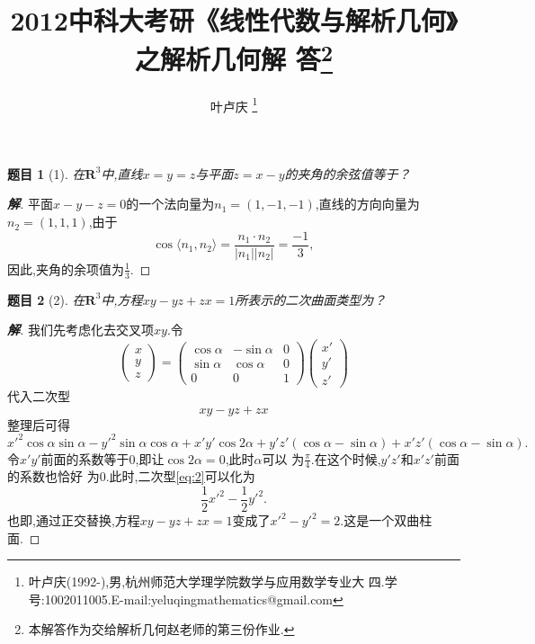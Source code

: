 ﻿\documentclass[a4paper]{article}
\newtheorem*{exe}{题目}
\newenvironment{exercise}
{\bigskip\begin{mdframed}\begin{exe}}
    {\end{exe}\end{mdframed}\bigskip}
\numberwithin{equation}{section}
\begin{document}
\title{{\bf{2012中科大考研《线性代数与解析几何》之解析几何解
      答\footnote{本解答作为交给解析几何赵老师的第三份作业.}}}} \author{\small{叶卢庆
    \footnote{叶卢庆(1992-),男,杭州师范大学理学院数学与应用数学专业大
      四.学号:1002011005.E-mail:yeluqingmathematics@gmail.com}}}
\maketitle
\begin{exercise}[1]
  在$\mathbf{R}^3$中,直线$x=y=z$与平面$z=x-y$的夹角的余弦值等于？
\end{exercise}
\begin{proof}[\textbf{解}]
平面$x-y-z=0$的一个法向量为$n_{1}=(1,-1,-1)$,直线的方向向量为
$n_{2}=(1,1,1)$,由于
$$
\cos \langle n_1,n_2\rangle=\frac{n_1\cdot n_2}{|n_1||n_2|}=\frac{-1}{3},
$$
因此,夹角的余项值为$\frac{1}{3}$.
\end{proof}
\begin{exercise}[2]
  在$\mathbf{R}^3$中,方程$xy-yz+zx=1$所表示的二次曲面类型为？
\end{exercise}
\begin{proof}[\textbf{解}]
  我们先考虑化去交叉项$xy$.令
$$
\begin{pmatrix}
  x\\
  y\\
  z
\end{pmatrix}=
\begin{pmatrix}
  \cos\alpha&-\sin\alpha&0\\
  \sin\alpha&\cos\alpha&0\\
  0&0&1
\end{pmatrix}
\begin{pmatrix}
  x'\\
  y'\\
  z'
\end{pmatrix}
$$
代入二次型
\begin{equation}
  \label{eq:1}
  xy-yz+zx
\end{equation}
整理后可得
\begin{equation}
  \label{eq:2}
  x'^{2}\cos\alpha\sin\alpha-y'^{2}\sin\alpha\cos\alpha+x'y'\cos
  2\alpha+y'z'(\cos\alpha-\sin\alpha)+x'z'(\cos\alpha-\sin\alpha).
\end{equation}
令$x'y'$前面的系数等于$0$,即让$\cos 2\alpha=0$,此时$\alpha$可以
为$\frac{\pi}{4}$.在这个时候,$y'z'$和$x'z'$前面的系数也恰好
为$0$.此时,二次型\eqref{eq:2}可以化为
$$
\frac{1}{2}x'^2-\frac{1}{2}y'^2.
$$
也即,通过正交替换,方程$xy-yz+zx=1$变成了$x'^2-y'^2=2$.这是一个双曲柱面.
\end{proof}
\end{document}
